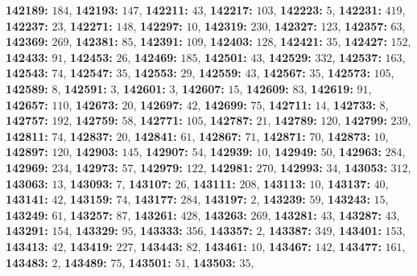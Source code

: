 \textsf{\bfseries 142189:} $184$, \textsf{\bfseries 142193:} $147$, \textsf{\bfseries 142211:} $43$, \textsf{\bfseries 142217:} $103$, \textsf{\bfseries 142223:} $5$, \textsf{\bfseries 142231:} $419$, \textsf{\bfseries 142237:} $23$, \textsf{\bfseries 142271:} $148$, \textsf{\bfseries 142297:} $10$, \textsf{\bfseries 142319:} $230$, \textsf{\bfseries 142327:} $123$, \textsf{\bfseries 142357:} $63$, \textsf{\bfseries 142369:} $269$, \textsf{\bfseries 142381:} $85$, \textsf{\bfseries 142391:} $109$, \textsf{\bfseries 142403:} $128$, \textsf{\bfseries 142421:} $35$, \textsf{\bfseries 142427:} $152$, \textsf{\bfseries 142433:} $91$, \textsf{\bfseries 142453:} $26$, \textsf{\bfseries 142469:} $185$, \textsf{\bfseries 142501:} $43$, \textsf{\bfseries 142529:} $332$, \textsf{\bfseries 142537:} $163$, \textsf{\bfseries 142543:} $74$, \textsf{\bfseries 142547:} $35$, \textsf{\bfseries 142553:} $29$, \textsf{\bfseries 142559:} $43$, \textsf{\bfseries 142567:} $35$, \textsf{\bfseries 142573:} $105$, \textsf{\bfseries 142589:} $8$, \textsf{\bfseries 142591:} $3$, \textsf{\bfseries 142601:} $3$, \textsf{\bfseries 142607:} $15$, \textsf{\bfseries 142609:} $83$, \textsf{\bfseries 142619:} $91$, \textsf{\bfseries 142657:} $110$, \textsf{\bfseries 142673:} $20$, \textsf{\bfseries 142697:} $42$, \textsf{\bfseries 142699:} $75$, \textsf{\bfseries 142711:} $14$, \textsf{\bfseries 142733:} $8$, \textsf{\bfseries 142757:} $192$, \textsf{\bfseries 142759:} $58$, \textsf{\bfseries 142771:} $105$, \textsf{\bfseries 142787:} $21$, \textsf{\bfseries 142789:} $120$, \textsf{\bfseries 142799:} $239$, \textsf{\bfseries 142811:} $74$, \textsf{\bfseries 142837:} $20$, \textsf{\bfseries 142841:} $61$, \textsf{\bfseries 142867:} $71$, \textsf{\bfseries 142871:} $70$, \textsf{\bfseries 142873:} $10$, \textsf{\bfseries 142897:} $120$, \textsf{\bfseries 142903:} $145$, \textsf{\bfseries 142907:} $54$, \textsf{\bfseries 142939:} $10$, \textsf{\bfseries 142949:} $50$, \textsf{\bfseries 142963:} $284$, \textsf{\bfseries 142969:} $234$, \textsf{\bfseries 142973:} $57$, \textsf{\bfseries 142979:} $122$, \textsf{\bfseries 142981:} $270$, \textsf{\bfseries 142993:} $34$, \textsf{\bfseries 143053:} $312$, \textsf{\bfseries 143063:} $13$, \textsf{\bfseries 143093:} $7$, \textsf{\bfseries 143107:} $26$, \textsf{\bfseries 143111:} $208$, \textsf{\bfseries 143113:} $10$, \textsf{\bfseries 143137:} $40$, \textsf{\bfseries 143141:} $42$, \textsf{\bfseries 143159:} $74$, \textsf{\bfseries 143177:} $284$, \textsf{\bfseries 143197:} $2$, \textsf{\bfseries 143239:} $59$, \textsf{\bfseries 143243:} $15$, \textsf{\bfseries 143249:} $61$, \textsf{\bfseries 143257:} $87$, \textsf{\bfseries 143261:} $428$, \textsf{\bfseries 143263:} $269$, \textsf{\bfseries 143281:} $43$, \textsf{\bfseries 143287:} $43$, \textsf{\bfseries 143291:} $154$, \textsf{\bfseries 143329:} $95$, \textsf{\bfseries 143333:} $356$, \textsf{\bfseries 143357:} $2$, \textsf{\bfseries 143387:} $349$, \textsf{\bfseries 143401:} $153$, \textsf{\bfseries 143413:} $42$, \textsf{\bfseries 143419:} $227$, \textsf{\bfseries 143443:} $82$, \textsf{\bfseries 143461:} $10$, \textsf{\bfseries 143467:} $142$, \textsf{\bfseries 143477:} $161$, \textsf{\bfseries 143483:} $2$, \textsf{\bfseries 143489:} $75$, \textsf{\bfseries 143501:} $51$, \textsf{\bfseries 143503:} $35$, 
